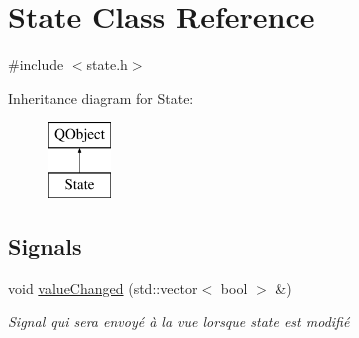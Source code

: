 \hypertarget{class_state}{}\section{State Class Reference}
\label{class_state}


{\ttfamily \#include $<$state.\+h$>$}

Inheritance diagram for State\+:\begin{figure}[H]
\begin{center}
\leavevmode
\includegraphics[height=2.000000cm]{class_state}
\end{center}
\end{figure}
\subsection*{Signals}
\begin{DoxyCompactItemize}
\item 
void \mbox{\hyperlink{class_state_a7a3e3dd36808cc394e8514902d55b856}{value\+Changed}} (std\+::vector$<$ bool $>$ \&)
\begin{DoxyCompactList}\small\item\em Signal qui sera envoyé à la vue lorsque state est modifié \end{DoxyCompactList}\end{DoxyCompactItemize}
